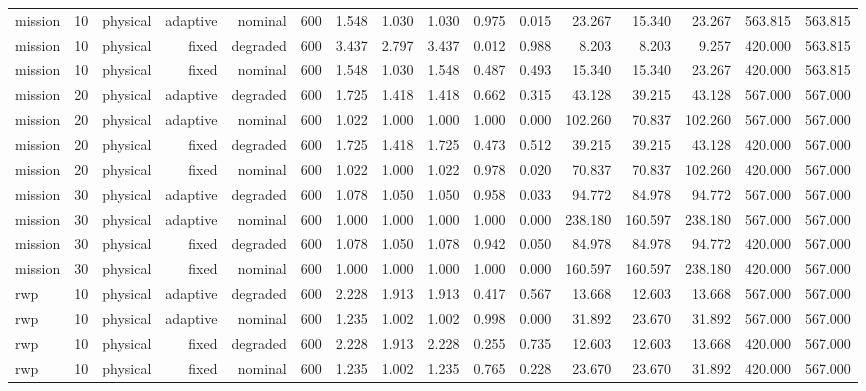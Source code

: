 \begin{tabular}{lrrrrrrrrrrrrrrr}
mission & 10 & physical & adaptive & nominal & 600 & 1.548 & 1.030 & 1.030 & 0.975 & 0.015 & 23.267 & 15.340 & 23.267 & 563.815 & 563.815 \\
mission & 10 & physical & fixed & degraded & 600 & 3.437 & 2.797 & 3.437 & 0.012 & 0.988 & 8.203 & 8.203 & 9.257 & 420.000 & 563.815 \\
mission & 10 & physical & fixed & nominal & 600 & 1.548 & 1.030 & 1.548 & 0.487 & 0.493 & 15.340 & 15.340 & 23.267 & 420.000 & 563.815 \\
mission & 20 & physical & adaptive & degraded & 600 & 1.725 & 1.418 & 1.418 & 0.662 & 0.315 & 43.128 & 39.215 & 43.128 & 567.000 & 567.000 \\
mission & 20 & physical & adaptive & nominal & 600 & 1.022 & 1.000 & 1.000 & 1.000 & 0.000 & 102.260 & 70.837 & 102.260 & 567.000 & 567.000 \\
mission & 20 & physical & fixed & degraded & 600 & 1.725 & 1.418 & 1.725 & 0.473 & 0.512 & 39.215 & 39.215 & 43.128 & 420.000 & 567.000 \\
mission & 20 & physical & fixed & nominal & 600 & 1.022 & 1.000 & 1.022 & 0.978 & 0.020 & 70.837 & 70.837 & 102.260 & 420.000 & 567.000 \\
mission & 30 & physical & adaptive & degraded & 600 & 1.078 & 1.050 & 1.050 & 0.958 & 0.033 & 94.772 & 84.978 & 94.772 & 567.000 & 567.000 \\
mission & 30 & physical & adaptive & nominal & 600 & 1.000 & 1.000 & 1.000 & 1.000 & 0.000 & 238.180 & 160.597 & 238.180 & 567.000 & 567.000 \\
mission & 30 & physical & fixed & degraded & 600 & 1.078 & 1.050 & 1.078 & 0.942 & 0.050 & 84.978 & 84.978 & 94.772 & 420.000 & 567.000 \\
mission & 30 & physical & fixed & nominal & 600 & 1.000 & 1.000 & 1.000 & 1.000 & 0.000 & 160.597 & 160.597 & 238.180 & 420.000 & 567.000 \\
rwp & 10 & physical & adaptive & degraded & 600 & 2.228 & 1.913 & 1.913 & 0.417 & 0.567 & 13.668 & 12.603 & 13.668 & 567.000 & 567.000 \\
rwp & 10 & physical & adaptive & nominal & 600 & 1.235 & 1.002 & 1.002 & 0.998 & 0.000 & 31.892 & 23.670 & 31.892 & 567.000 & 567.000 \\
rwp & 10 & physical & fixed & degraded & 600 & 2.228 & 1.913 & 2.228 & 0.255 & 0.735 & 12.603 & 12.603 & 13.668 & 420.000 & 567.000 \\
rwp & 10 & physical & fixed & nominal & 600 & 1.235 & 1.002 & 1.235 & 0.765 & 0.228 & 23.670 & 23.670 & 31.892 & 420.000 & 567.000 \\

\end{tabular}
